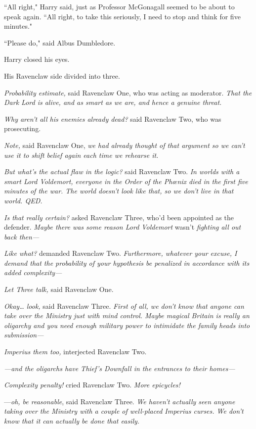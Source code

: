 ``All right," Harry said, just as Professor McGonagall seemed to be about to speak again. ``All right, to take this seriously, I need to stop and think for five minutes."

``Please do," said Albus Dumbledore.

Harry closed his eyes.

His Ravenclaw side divided into three.

\emph{Probability estimate,} said Ravenclaw One, who was acting as moderator. \emph{That the Dark Lord is alive, and as smart as we are, and hence a genuine threat.}

\emph{Why aren't all his enemies already dead?} said Ravenclaw Two, who was prosecuting.

\emph{Note,} said Ravenclaw One, \emph{we had already thought of that argument so we can't use it to shift belief \emph{again} each time we rehearse it.}

\emph{But what's the actual flaw in the logic?} said Ravenclaw Two. \emph{In worlds with a smart Lord Voldemort, everyone in the Order of the Phœnix died in the first five minutes of the war. The world doesn't look like that, so we don't live in that world. QED.}

\emph{Is that really certain?} asked Ravenclaw Three, who'd been appointed as the defender. \emph{Maybe there was some reason Lord Voldemort} wasn't \emph{fighting all out back then—}

\emph{Like what?} demanded Ravenclaw Two. \emph{Furthermore, whatever your excuse, I demand that the probability of your hypothesis be penalized in accordance with its added complexity—}

\emph{Let Three talk,} said Ravenclaw One.

\emph{Okay{\ldots} look,} said Ravenclaw Three. \emph{First of all, we don't \emph{know} that anyone can take over the Ministry just with mind control. Maybe magical Britain is really an oligarchy and you need enough military power to intimidate the family heads into submission—}

\emph{Imperius them too,} interjected Ravenclaw Two.

\emph{—and the oligarchs have Thief's Downfall in the entrances to \emph{their} homes—}

\emph{Complexity penalty!} cried Ravenclaw Two. \emph{More epicycles!}

—\emph{oh, be reasonable}, said Ravenclaw Three. \emph{We haven't actually \emph{seen} anyone taking over the Ministry with a couple of well-placed Imperius curses. We don't \emph{know} that it can actually be done that easily.}

